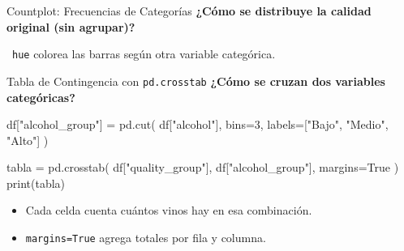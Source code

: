 \documentclass[aspectratio=169, 11pt]{beamer}
\begin{document}
\begin{frame}[fragile,shrink=28]{Countplot: Frecuencias de Categorías}
  \vspace{-6pt}
  {\footnotesize\color{arcaDark}\bfseries
    ¿Cómo se distribuye la calidad original (sin agrupar)?}

  \vspace{4pt}

  \vspace{4pt}
  {\scriptsize\color{textMuted}
    \faLightbulb\ \texttt{hue} colorea las barras según otra variable categórica.}
\end{frame}

\begin{frame}[fragile,shrink=28]{Tabla de Contingencia con \texttt{pd.crosstab}}
  \vspace{-6pt}
  {\footnotesize\color{arcaDark}\bfseries
    ¿Cómo se cruzan dos variables categóricas?}

  \vspace{4pt}
  \begin{pyblock}
df["alcohol_group"] = pd.cut(
    df["alcohol"], bins=3,
    labels=["Bajo", "Medio", "Alto"]
)

tabla = pd.crosstab(
    df["quality_group"], df["alcohol_group"],
    margins=True
)
print(tabla)
  \end{pyblock}

  \vspace{4pt}
  {\scriptsize\color{textMuted}
  \begin{itemize}\setlength{\itemsep}{3pt}
    \item[{\color{arcaRed}\scriptsize\faArrowRight}]
      Cada celda cuenta cuántos vinos hay en esa combinación.
    \item[{\color{codeGreen}\scriptsize\faArrowRight}]
      \texttt{margins=True} agrega totales por fila y columna.
  \end{itemize}
  }
\end{frame}
\end{document}
